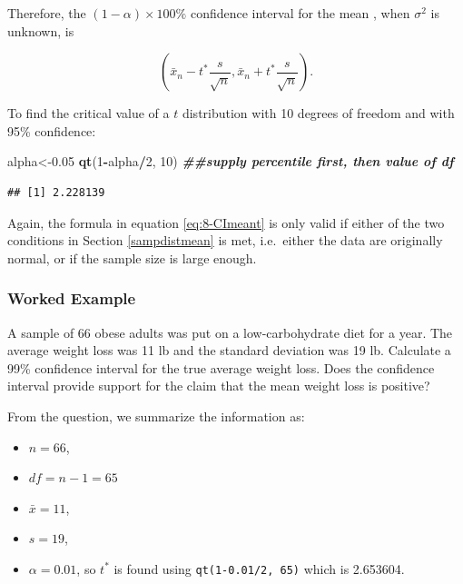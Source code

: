 \documentclass[
]{book}
\newenvironment{Shaded}{\begin{snugshade}}{\end{snugshade}}
\newcommand{\DecValTok}[1]{\textcolor[rgb]{0.00,0.00,0.81}{#1}}
\newcommand{\DocumentationTok}[1]{\textcolor[rgb]{0.56,0.35,0.01}{\textbf{\textit{#1}}}}
\newcommand{\FloatTok}[1]{\textcolor[rgb]{0.00,0.00,0.81}{#1}}
\newcommand{\FunctionTok}[1]{\textcolor[rgb]{0.13,0.29,0.53}{\textbf{#1}}}
\newcommand{\NormalTok}[1]{#1}
\newcommand{\OtherTok}[1]{\textcolor[rgb]{0.56,0.35,0.01}{#1}}
\newcommand{\SpecialCharTok}[1]{\textcolor[rgb]{0.81,0.36,0.00}{\textbf{#1}}}
\providecommand{\tightlist}{%
  \setlength{\itemsep}{0pt}\setlength{\parskip}{0pt}}
\begin{document}
Therefore, the \((1-\alpha) \times 100\%\) confidence interval for the mean , when \(\sigma^2\) is unknown, is

\begin{equation} 
\left( \bar{x}_n - t^{*} \frac{s}{\sqrt{n}}, \bar{x}_n + t^{*} \frac{s}{\sqrt{n}} \right).
\label{eq:8-CImeant}
\end{equation}

To find the critical value of a \(t\) distribution with 10 degrees of freedom and with 95\% confidence:

\begin{Shaded}
\begin{Highlighting}[]
\NormalTok{alpha}\OtherTok{\textless{}{-}}\FloatTok{0.05}
\FunctionTok{qt}\NormalTok{(}\DecValTok{1}\SpecialCharTok{{-}}\NormalTok{alpha}\SpecialCharTok{/}\DecValTok{2}\NormalTok{, }\DecValTok{10}\NormalTok{) }\DocumentationTok{\#\#supply percentile first, then value of df}
\end{Highlighting}
\end{Shaded}

\begin{verbatim}
## [1] 2.228139
\end{verbatim}

Again, the formula in equation \eqref{eq:8-CImeant} is only valid if either of the two conditions in Section \ref{sampdistmean} is met, i.e.~either the data are originally normal, or if the sample size is large enough.

\subsubsection{Worked Example}\label{worked-example-2}

A sample of 66 obese adults was put on a low-carbohydrate diet for a year. The average weight loss was 11 lb and the
standard deviation was 19 lb. Calculate a 99\% confidence interval for the true average weight loss. Does the confidence interval provide support for the claim that the mean weight loss is positive?

From the question, we summarize the information as:

\begin{itemize}
\tightlist
\item
  \(n = 66\),
\item
  \(df = n-1 = 65\)
\item
  \(\bar{x} = 11\),
\item
  \(s = 19\),
\item
  \(\alpha = 0.01\), so \(t^*\) is found using \texttt{qt(1-0.01/2,\ 65)} which is 2.653604.
\end{itemize}
\end{document}
